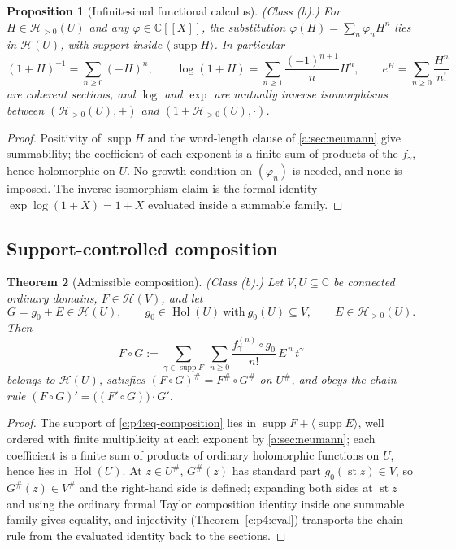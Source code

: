 \documentclass[11pt,a4paper]{article}
\numberwithin{equation}{section}
\newtheorem{theorem}{Theorem}[section]
\newtheorem{proposition}[theorem]{Proposition}
\theoremstyle{definition}
\theoremstyle{remark}
\theoremstyle{plain}
\newcommand{\CC}{\mathbb C}
\DeclareMathOperator{\Hol}{Hol}
\DeclareMathOperator{\supp}{supp}
\DeclareMathOperator{\st}{st}
\newcommand{\tm}{t}
\newcommand{\halo}[1]{#1^{\#}}
\newcommand{\ev}[1]{#1^{\#}}
\newcommand{\Hc}{\mathcal H}
\newcommand{\Neu}[1]{\langle #1\rangle}
\begin{document}
\begin{proposition}[Infinitesimal functional calculus]
\label{c:p4:prop-calculus}
\emph{(Class (b).)} For $H\in\Hc_{>0}(U)$ and any $\varphi\in\CC[[X]]$,
the substitution $\varphi(H)=\sum_n\varphi_nH^n$ lies in $\Hc(U)$, with
support inside $\Neu{\supp H}$. In particular
\begin{equation}\label{c:p4:eq-smallcalc}
 (1+H)^{-1}=\sum_{n\ge0}(-H)^n,\qquad
 \log(1+H)=\sum_{n\ge1}\frac{(-1)^{n+1}}{n}H^n,\qquad
 e^{H}=\sum_{n\ge0}\frac{H^n}{n!}
\end{equation}
are coherent sections, and $\log$ and $\exp$ are mutually inverse
isomorphisms between $(\Hc_{>0}(U),+)$ and
$(1+\Hc_{>0}(U),\cdot)$.
\end{proposition}

\begin{proof}
Positivity of $\supp H$ and the word-length clause of
\ref{a:sec:neumann} give summability; the coefficient of each exponent is
a finite sum of products of the $f_\gamma$, hence holomorphic on $U$.
No growth condition on $(\varphi_n)$ is needed, and none is imposed.
The inverse-isomorphism claim is the formal identity
$\exp\log(1+X)=1+X$ evaluated inside a summable family.
\end{proof}

\subsection{Support-controlled composition}
\label{c:p4:comp}

\begin{theorem}[Admissible composition]\label{c:p4:composition}
\emph{(Class (b).)} Let $V,U\subseteq\CC$ be connected ordinary domains,
$F\in\Hc(V)$, and let
\[
 G=g_0+E\in\Hc(U),\qquad g_0\in\Hol(U)\ \text{with}\ g_0(U)\subseteq V,
 \qquad E\in\Hc_{>0}(U).
\]
Then
\begin{equation}\label{c:p4:eq-composition}
 F\circ G:=\sum_{\gamma\in\supp F}\ \sum_{n\ge0}
   \frac{f_\gamma^{(n)}\circ g_0}{n!}\,E^{\,n}\,\tm^\gamma
\end{equation}
belongs to $\Hc(U)$, satisfies
$\ev{(F\circ G)}=\ev F\circ\ev G$ on $\halo U$, and obeys the chain rule
$(F\circ G)'=\bigl((F'\circ G)\bigr)\cdot G'$.
\end{theorem}

\begin{proof}
The support of \eqref{c:p4:eq-composition} lies in
$\supp F+\Neu{\supp E}$, well ordered with finite multiplicity at each
exponent by \ref{a:sec:neumann}; each coefficient is a finite sum of
products of ordinary holomorphic functions on $U$, hence lies in
$\Hol(U)$. At $z\in\halo U$, $\ev G(z)$ has standard part
$g_0(\st z)\in V$, so $\ev G(z)\in\halo V$ and the right-hand side is
defined; expanding both sides at $\st z$ and using the ordinary formal
Taylor composition identity inside one summable family gives equality,
and injectivity (Theorem~\ref{c:p4:eval}) transports the chain rule from
the evaluated identity back to the sections.
\end{proof}
\end{document}
